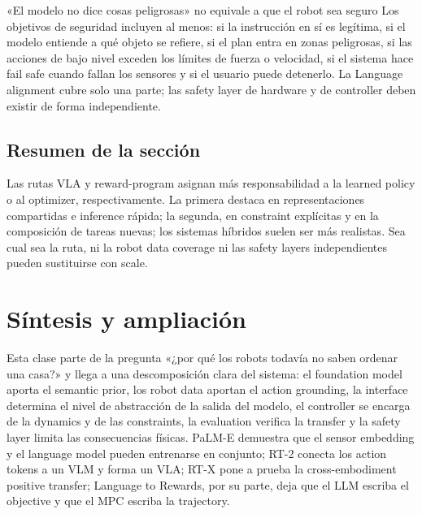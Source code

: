 \documentclass[a4paper]{article}
\begin{document}
\begin{warningbox}{«El modelo no dice cosas peligrosas» no equivale a que el robot sea seguro}
Los objetivos de seguridad incluyen al menos: si la instrucción en sí es legítima, si el modelo entiende a qué objeto se refiere, si el plan entra en zonas peligrosas, si las acciones de bajo nivel exceden los límites de fuerza o velocidad, si el sistema hace fail safe cuando fallan los sensores y si el usuario puede detenerlo. La Language alignment cubre solo una parte; las safety layer de hardware y de controller deben existir de forma independiente.
\end{warningbox}


\subsection{Resumen de la sección}

Las rutas VLA y reward-program asignan más responsabilidad a la learned policy o al optimizer, respectivamente. La primera destaca en representaciones compartidas e inference rápida; la segunda, en constraint explícitas y en la composición de tareas nuevas; los sistemas híbridos suelen ser más realistas. Sea cual sea la ruta, ni la robot data coverage ni las safety layers independientes pueden sustituirse con scale.
\section{Síntesis y ampliación}

Esta clase parte de la pregunta «¿por qué los robots todavía no saben ordenar una casa?» y llega a una descomposición clara del sistema: el foundation model aporta el semantic prior, los robot data aportan el action grounding, la interface determina el nivel de abstracción de la salida del modelo, el controller se encarga de la dynamics y de las constraints, la evaluation verifica la transfer y la safety layer limita las consecuencias físicas. PaLM-E demuestra que el sensor embedding y el language model pueden entrenarse en conjunto; RT-2 conecta los action tokens a un VLM y forma un VLA; RT-X pone a prueba la cross-embodiment positive transfer; Language to Rewards, por su parte, deja que el LLM escriba el objective y que el MPC escriba la trajectory.
\end{document}
